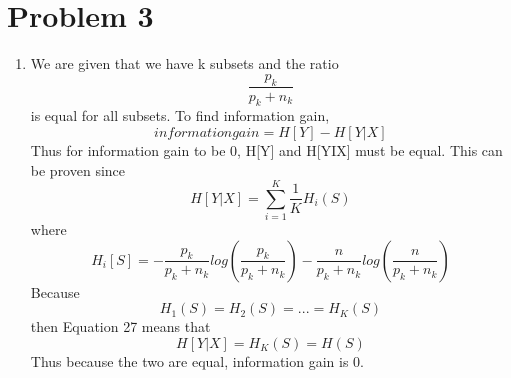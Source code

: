 \documentclass[11pt]{article}
\begin{document}
\newpage
\section{Problem 3}
    \begin{enumerate}
        \item 
            We are given that we have k subsets and the ratio 
            \begin{equation}
                \frac{p_{k}}{p_{k}+n_{k}}
            \end{equation}
            is equal for all subsets.
            To find information gain,
            \begin{equation}
                informationgain=H[Y]-H[Y|X]
            \end{equation}
            Thus for information gain to be 0, H[Y] and H[YIX] must be equal. This can be proven since 
            \begin{equation}
                H[Y|X]=\sum_{i=1}^{K} \frac{1}{K}H_{i}(S)
            \end{equation}
            where 
            \begin{equation}
                H_{i}[S]=-\frac{p_{k}}{p_{k}+n_{k}}log(\frac{p_{k}}{p_{k}+n_{k}})-\frac{n}{p_{k}+n_{k}}log(\frac{n}{p_{k}+n_{k}})
            \end{equation}
            Because
            \begin{equation}
                H_{1}(S)=H_{2}(S)=...=H_{K}(S)
            \end{equation}
            then Equation 27 means that 
            \begin{equation}
                H[Y|X]=H_{K}(S)=H(S)
            \end{equation}
            Thus because the two are equal, information gain is 0.
    \end{enumerate}

\newpage
\end{document}
